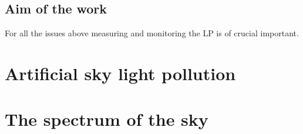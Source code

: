 \documentclass[a4paper, titlepage, 10pt]{book}
\begin{document}
\section{Aim of the work}
For all the issues above measuring and monitoring the LP is of crucial important. 


\chapter{Artificial sky light pollution}
\chapter{The spectrum of the sky}





\end{document}
